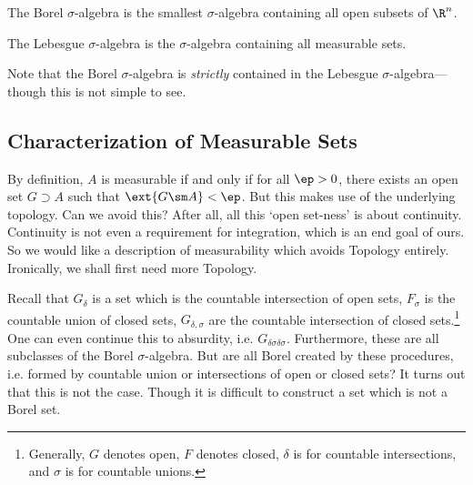 \begin{dfn}
The Borel $\sigma$-algebra is the smallest $\sigma$-algebra containing all open subsets of $\R^n$. 
\end{dfn}


\begin{dfn}
The Lebesgue $\sigma$-algebra is the $\sigma$-algebra containing all measurable sets. 
\end{dfn}

Note that the Borel $\sigma$-algebra is \emph{strictly} contained in the Lebesgue $\sigma$-algebra---though this is not simple to see. 










































 \subsection{Characterization of Measurable Sets}
 
 By definition, $A$ is measurable if and only if for all $\ep>0$, there exists an open set $G \supset A$ such that $\ext{G \sm A}<\ep$. But this makes use of the underlying topology. Can we avoid this? After all, all this `open set-ness' is about continuity. Continuity is not even a requirement for integration, which is an end goal of ours. So we would like a description of measurability which avoids Topology entirely. Ironically, we shall first need more Topology.
 
 Recall that $G_\delta$ is a set which is the countable intersection of open sets, $F_\sigma$ is the countable union of closed sets, $G_{\delta,\sigma}$ are the countable intersection of closed sets.\footnote{Generally, $G$ denotes open, $F$ denotes closed, $\delta$ is for countable intersections, and $\sigma$ is for countable unions.} One can even continue this to absurdity, i.e. $G_{\delta\sigma\delta\sigma}$. Furthermore, these are all subclasses of the Borel $\sigma$-algebra. But are all Borel created by these procedures, i.e. formed by countable union or intersections of open or closed sets? It turns out that this is not the case. Though it is difficult to construct a set which is not a Borel set. 
 
